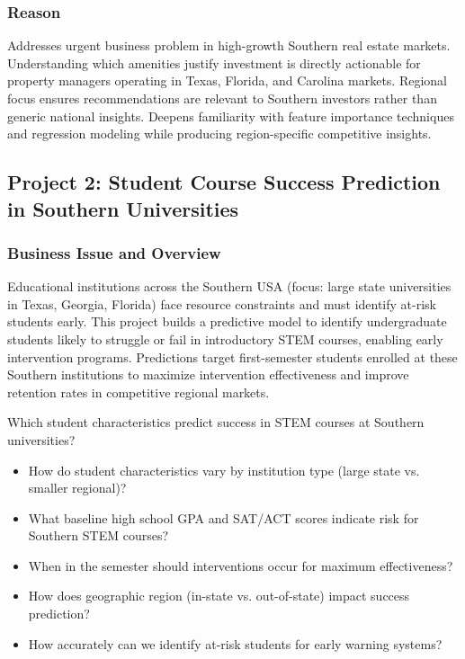 \subsubsection*{Reason}

Addresses urgent business problem in high-growth Southern real estate markets. Understanding which amenities justify investment is directly actionable for property managers operating in Texas, Florida, and Carolina markets. Regional focus ensures recommendations are relevant to Southern investors rather than generic national insights. Deepens familiarity with feature importance techniques and regression modeling while producing region-specific competitive insights.

\newpage

\subsection*{Project 2: Student Course Success Prediction in Southern Universities}

\subsubsection*{Business Issue and Overview}

Educational institutions across the Southern USA (focus: large state universities in Texas, Georgia, Florida) face resource constraints and must identify at-risk students early. This project builds a predictive model to identify undergraduate students likely to struggle or fail in introductory STEM courses, enabling early intervention programs. Predictions target first-semester students enrolled at these Southern institutions to maximize intervention effectiveness and improve retention rates in competitive regional markets.

Which student characteristics predict success in STEM courses at Southern universities?
\begin{itemize} [itemsep = -9pt]
    \item How do student characteristics vary by institution type (large state vs. smaller regional)?
    \item What baseline high school GPA and SAT/ACT scores indicate risk for Southern STEM courses?
    \item When in the semester should interventions occur for maximum effectiveness?
    \item How does geographic region (in-state vs. out-of-state) impact success prediction?
    \item How accurately can we identify at-risk students for early warning systems?
\end{itemize}

